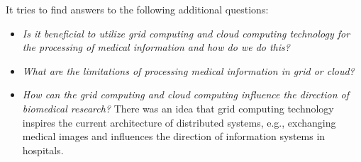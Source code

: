 It tries to find answers to the following additional questions:
\begin{itemize}
\item \emph{Is it beneficial to utilize grid computing and cloud computing technology for the processing of medical information and how do we do this?} %
\item \emph{What are the limitations of processing medical information in grid or cloud?} 
\item \emph{How can the grid computing and cloud computing influence the direction of biomedical research?} There was an idea that grid computing technology inspires the current architecture of distributed systems,  e.g., exchanging medical images and influences the direction of information systems in hospitals. 
\end{itemize}

